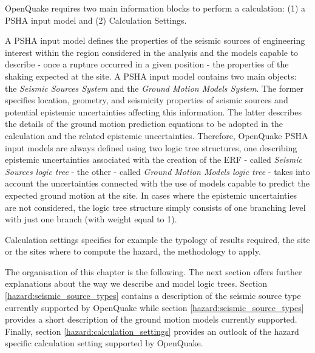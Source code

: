 %
%
OpenQuake requires two main information blocks to perform a calculation: (1) 
a PSHA input model and (2) Calculation Settings.

A PSHA input model defines the properties of the seismic sources 
of engineering  interest within the region considered in the analysis and the 
models capable to describe - once a rupture occurred in a given position - the 
properties of the shaking expected at the site. 
%
A PSHA input model contains two main objects: the \emph{Seismic Sources System} 
and the \emph{Ground Motion Models System}. 
%
The former specifies location, geometry, and seismicity properties of seismic 
sources and potential epistemic uncertainties affecting this information. 
%
The latter describes the details of the ground motion prediction equations to 
be adopted in the calculation and the related epistemic uncertainties. 
%
Therefore, OpenQuake PSHA input models are always defined using two logic 
tree structures, one describing epistemic uncertainties associated with the 
creation of the ERF - called \emph{Seismic Sources logic tree} - 
the other - called \emph{Ground Motion Models logic tree} - takes into account 
the uncertainties connected with the use of models capable to predict the 
expected ground motion at the site. 
%
In cases where the epistemic uncertainties are not considered, the logic tree 
structure simply consists of one branching level with just one branch (with 
weight equal to 1).

Calculation settings specifies for example the typology of results required,
the site or the sites where to compute the hazard, the methodology to apply.

The organisation of this chapter is the following. The next section offers
further explanations about the way we describe and model logic trees. 
Section \ref{hazard:seismic_source_types} contains a description of the seismic
source type currently supported by OpenQuake while section 
\ref{hazard:seismic_source_types} provides a short description of the 
ground motion models currently supported. Finally, section 
\ref{hazard:calculation_settings} provides an outlook of the hazard 
specific calculation setting supported by OpenQuake.
%

\clearpage
%

%
